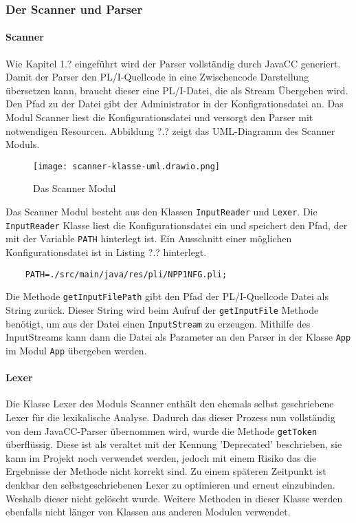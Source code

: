\subsubsection{Der Scanner und Parser}
\paragraph{Scanner}
Wie Kapitel 1.? eingeführt wird der Parser vollständig durch JavaCC generiert.
Damit der Parser den PL/I-Quellcode in eine Zwischencode Darstellung übersetzen kann,
braucht dieser eine PL/I-Datei, die als Stream Übergeben wird.
Den Pfad zu der Datei gibt der Administrator in der Konfigrationsdatei an.
Das Modul Scanner liest die Konfigurationsdatei und versorgt den Parser mit notwendigen Resourcen.
Abbildung ?.? zeigt das UML-Diagramm des Scanner Moduls.

\begin{figure}[h]
	\centering
	\caption{Das Scanner Modul}
	\texttt{[image: scanner-klasse-uml.drawio.png]}
	\label{fig:Scanner Modul}
\end{figure}

Das Scanner Modul besteht aus den Klassen \verb+InputReader+ und \verb+Lexer+. 
Die \verb+InputReader+ Klasse liest die Konfigurationsdatei ein und speichert den Pfad, der mit der Variable \verb+PATH+
hinterlegt ist. Ein Ausschnitt einer möglichen Konfigurationsdatei ist in Listing ?.? hinterlegt.

\begin{verbatim}
	PATH=./src/main/java/res/pli/NPP1NFG.pli;
\end{verbatim}

Die Methode \verb+getInputFilePath+ gibt den Pfad der PL/I-Quellcode Datei als String zurück.
Dieser String wird beim Aufruf der \verb+getInputFile+ Methode benötigt, um aus der Datei einen \verb+InputStream+ zu erzeugen.
Mithilfe des InputStreams kann dann die Datei als Parameter an den Parser in der Klasse \verb+App+ im Modul \verb+App+
übergeben werden. 


\paragraph{Lexer}
Die Klasse Lexer des Moduls Scanner enthält den ehemals selbst geschriebene Lexer für die lexikalische Analyse. Dadurch das dieser Prozess nun vollständig von dem JavaCC-Parser übernommen wird, wurde die Methode \verb+getToken+ überflüssig. Diese ist als veraltet mit der Kennung 'Deprecated' beschrieben, sie kann im Projekt noch verwendet werden, jedoch mit einem Risiko das die Ergebnisse der Methode nicht korrekt sind. 
Zu einem späteren Zeitpunkt ist denkbar den selbstgeschriebenen Lexer zu optimieren und erneut einzubinden. Weshalb dieser nicht gelöscht wurde. 
Weitere Methoden in dieser Klasse werden ebenfalls nicht länger von Klassen aus anderen Modulen verwendet. 

